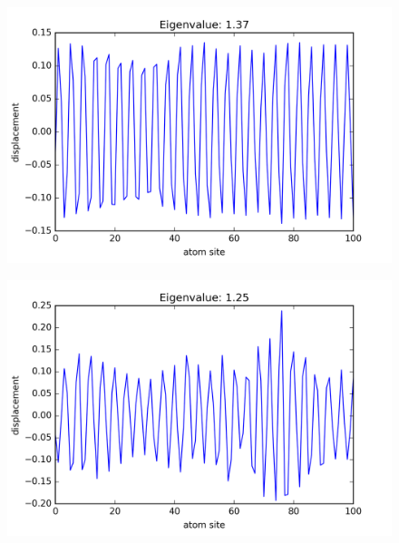 



\begin{figure}[!htbh]
\centering
\begin{minipage}{.45\textwidth}
  \centering
  \includegraphics[width=1.1\linewidth]{Harmonic_mass_ratio/normal_Prob_0_5N_103m_1_1p_51th.png}
  \label{fig:mass ratio 1.1 51st}
\end{minipage}\qquad
\begin{minipage}{.45\textwidth}
  \centering
  \includegraphics[width=1.1\linewidth]{Harmonic_mass_ratio/normal_Prob_0_5N_103m_1_5p_51th.png}
  \label{fig:mass ratio 1.5 51st}
\end{minipage}
\end{figure}

